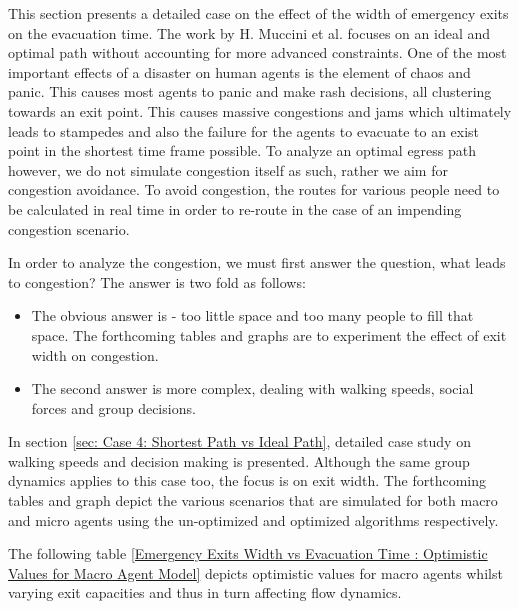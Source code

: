 This section presents a detailed case on the effect of the width of emergency exits on the evacuation time. The work by H. Muccini et al. \cite{ref5} focuses on an ideal and optimal path without accounting for more advanced constraints. One of the most important effects of a disaster on human agents is the element of chaos and panic. This causes most agents to panic and make rash decisions, all clustering towards an exit point. This causes massive congestions and jams which ultimately leads to stampedes and also the failure for the agents to evacuate to an exist point in the shortest time frame possible. To analyze an optimal egress path however, we do not simulate congestion itself as such, rather we aim for congestion avoidance. To avoid congestion, the routes for various people need to be calculated in real time in order to re-route in the case of an impending congestion scenario.

In order to analyze the congestion, we must first answer the question, what leads to congestion? The answer is two fold as follows:
\begin{itemize}
  \item The obvious answer is - too little space and too many people to fill that space. The forthcoming tables and graphs are to experiment the effect of exit width on congestion.
  \item The second answer is more complex, dealing with walking speeds, social forces and group decisions. 
\end{itemize}

In section \ref{sec: Case 4: Shortest Path vs Ideal Path}, detailed case study on walking speeds and decision making is presented. Although the same group dynamics applies to this case too, the focus is on exit width. The forthcoming tables and graph depict the various scenarios that are simulated for both macro and micro agents using the un-optimized and optimized algorithms respectively.

The following table \ref{Emergency Exits Width vs Evacuation Time : Optimistic Values for Macro Agent Model} depicts optimistic values for macro agents whilst varying exit capacities and thus in turn affecting flow dynamics.

